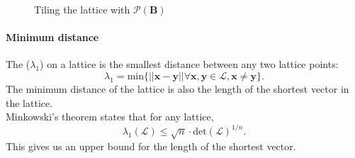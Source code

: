 \begin{figure}[ht]
\begin{minipage}{.5\textwidth}
{{}}
	\caption{Tiling the lattice with $\mathcal{P}(\textbf{B})$}
	\label{fg:tile}
\end{minipage}
\end{figure}

\paragraph{Minimum distance} The  ($\lambda_1$) on a lattice is the smallest distance between any two lattice points: $$\lambda_1 = \text{min}\{||\textbf{x} - \textbf{y}|| \forall \textbf{x},\textbf{y}\in\mathcal{L}, \textbf{x}\neq\textbf{y}\}.$$
The minimum distance of the lattice is also the length of the shortest vector in the lattice.
\\
Minkowski's theorem states that for any lattice, 
\[
    \lambda_1(\mathcal{L}) \leq \sqrt{n}\cdot\text{det}(\mathcal{L})^{1/n}. 
\]
This gives us an upper bound for the length of the shortest vector.
